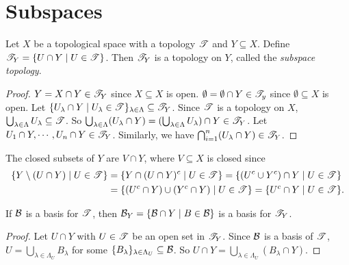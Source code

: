 \section*{Subspaces}

\begin{proposition}
    Let $X$ be a topological space with a topology $\mathscr{T}$ and $Y \subseteq X$. Define $\mathscr{T}_Y = \{U \cap Y \mid U \in \mathscr{T}\}$. Then $\mathscr{T}_Y$ is a topology on $Y$, called the \emph{subspace topology}.
\end{proposition}

\begin{proof}
    $Y = X \cap Y \in \mathscr{T}_Y$ since $X \subseteq X$ is open. $\emptyset = \emptyset \cap Y  \in \mathscr{T}_y$ since $\emptyset \subseteq X$ is open. Let $\{U_\lambda \cap Y \mid U_\lambda \in \mathscr{T}\}_{\lambda \in \Lambda} \subseteq \mathscr{T}_Y$. Since $\mathscr{T}$ is a topology on $X$, $\bigcup_{\lambda \in \Lambda} U_\lambda \subseteq \mathscr{T}$. So $\bigcup_{\lambda \in \Lambda} (U_\lambda \cap Y) = (\bigcup_{\lambda \in \Lambda}U_\lambda) \cap Y \in \mathscr{T}_Y$. Let $U_1 \cap Y,\cdots,U_n \cap Y \in \mathscr{T}_Y$. Similarly, we have $\bigcap_{i=1}^n (U_\lambda \cap Y) \in \mathscr{T}_Y$. 
\end{proof}

\begin{remark}
    The closed subsets of $Y$ are $V \cap Y$, where $V \subseteq X$ is closed since 
    \begin{align*}
        \{Y \setminus (U \cap Y) \mid U \in \mathscr{T}\} &= \{Y \cap (U \cap Y)^c \mid U \in \mathscr{T}\} = \{(U^c \cup Y^c) \cap Y \mid U \in \mathscr{T}\} \\
                                                   &= \{(U^c \cap Y) \cup (Y^c \cap Y) \mid U \in \mathscr{T}\} = \{U^c \cap Y \mid U \in \mathscr{T}\}.
    \end{align*}
\end{remark}

\begin{proposition}
    If $\mathcal{B}$ is a basis for $\mathscr{T}$, then $\mathcal{B}_Y = \{\mathcal{B} \cap Y \mid B \in \mathcal{B}\}$ is a basis for $\mathscr{T}_Y$.
\end{proposition}

\begin{proof}
    Let $U \cap Y$ with $U \in \mathscr{T}$ be an open set in $\mathscr{T}_Y$. Since $\mathcal{B}$ is a basis of $\mathscr{T}$, $U = \bigcup_{\lambda \in \Lambda_U} B_\lambda$ for some $\{B_\lambda\}_{\lambda \in \Lambda_U} \subseteq \mathcal{B}$. So $U \cap Y = \bigcup_{\lambda \in \Lambda_U} (B_\lambda \cap Y)$. 
\end{proof}

